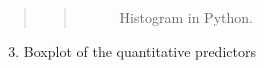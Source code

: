 \documentclass[letterpaper,11pt,english]{sphinxmanual}
\begin{document}
\begin{quote}
\begin{quote}
\begin{figure}[htbp]
\caption{Histogram in Python.}\label{dap:fig-histp}\end{figure}
\end{quote}
\end{quote}
\begin{enumerate}
\setcounter{enumi}{2}
\item {} 
Boxplot of the quantitative predictors

\end{enumerate}
\end{document}
